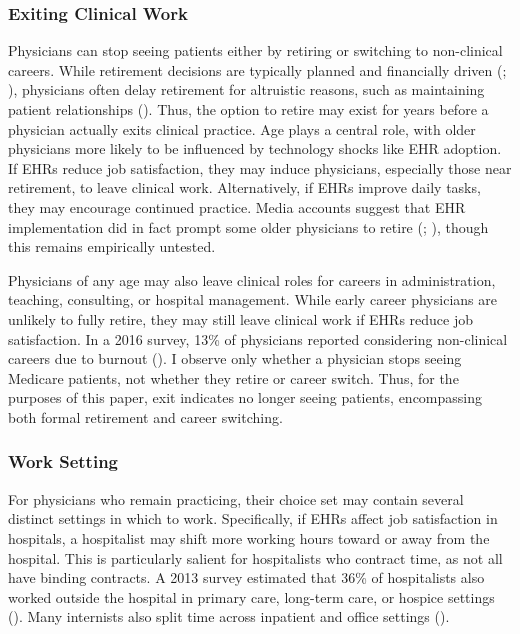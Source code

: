 \documentclass[12pt]{article}
\begin{document}
\subsubsection{Exiting Clinical Work}

Physicians can stop seeing patients either by retiring or switching to non-clinical careers. While retirement decisions are typically planned and financially driven (\cite{gustman1986disaggregated}; \cite{stock1990pension}), physicians often delay retirement for altruistic reasons, such as maintaining patient relationships (\cite{collier2017challenges}). Thus, the option to retire may exist for years before a physician actually exits clinical practice. Age plays a central role, with older physicians more likely to be influenced by technology shocks like EHR adoption. If EHRs reduce job satisfaction, they may induce physicians, especially those near retirement, to leave clinical work. Alternatively, if EHRs improve daily tasks, they may encourage continued practice. Media accounts suggest that EHR implementation did in fact prompt some older physicians to retire (\cite{ringel_2019}; \cite{loria_2020}), though this remains empirically untested.

Physicians of any age may also leave clinical roles for careers in administration, teaching, consulting, or hospital management. While early career physicians are unlikely to fully retire, they may still leave clinical work if EHRs reduce job satisfaction. In a 2016 survey, 13\% of physicians reported considering non-clinical careers due to burnout (\cite{physicians2016physicians}). I observe only whether a physician stops seeing Medicare patients, not whether they retire or career switch. Thus, for the purposes of this paper, exit indicates no longer seeing patients, encompassing both formal retirement and career switching.

\subsubsection{Work Setting}\label{sec:worksetting}

For physicians who remain practicing, their choice set may contain several distinct settings in which to work. Specifically, if EHRs affect job satisfaction in hospitals, a hospitalist may shift more working hours toward or away from the hospital. This is particularly salient for hospitalists who contract time, as not all have binding contracts. A 2013 survey estimated that 36\% of hospitalists also worked outside the hospital in primary care, long-term care, or hospice settings (\cite{Today}). Many internists also split time across inpatient and office settings (\cite{gray2022evolving}).
\end{document}
